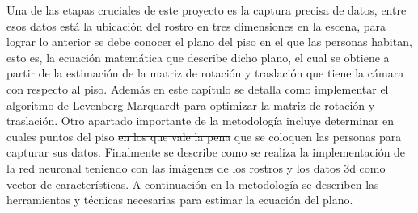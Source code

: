  Una de las etapas cruciales de este proyecto es la captura precisa de datos, entre esos datos está la ubicación del rostro en tres dimensiones en la escena, para lograr lo anterior se debe conocer el plano del piso en el que las personas habitan, esto es, la ecuación matemática que describe dicho plano, el cual se obtiene a partir de la estimación de la matriz de rotación y traslación que tiene la cámara con respecto al piso. Además en este capítulo se detalla como implementar el algoritmo de Levenberg-Marquardt para optimizar la matriz de rotación y traslación. Otro apartado importante de la metodología incluye determinar en cuales  puntos del piso \sout{en los que vale la pena} que se coloquen las personas para capturar sus datos. 
 Finalmente se describe como se realiza la implementación de la red neuronal teniendo con las imágenes de los rostros y los datos 3d como vector de características.
 A continuación en la metodología se describen las herramientas y técnicas necesarias para estimar la ecuación del plano.

